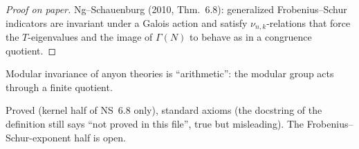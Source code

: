 \begin{proof}[Proof on paper]
Ng--Schauenburg (2010, Thm.~6.8): generalized Frobenius--Schur indicators are invariant under a Galois action and satisfy
$\nu_{n,k}$-relations that force the $T$-eigenvalues and the image of $\Gamma(N)$ to behave as in a congruence
quotient.
\end{proof}

\begin{physics}
Modular invariance of anyon theories is ``arithmetic'': the modular group acts through a finite quotient.
\end{physics}

\begin{status}
Proved (kernel half of NS~6.8 only), standard axioms (the docstring of the definition still says ``not proved in this file'',
true but misleading). The Frobenius--Schur-exponent half is open.
\end{status}


